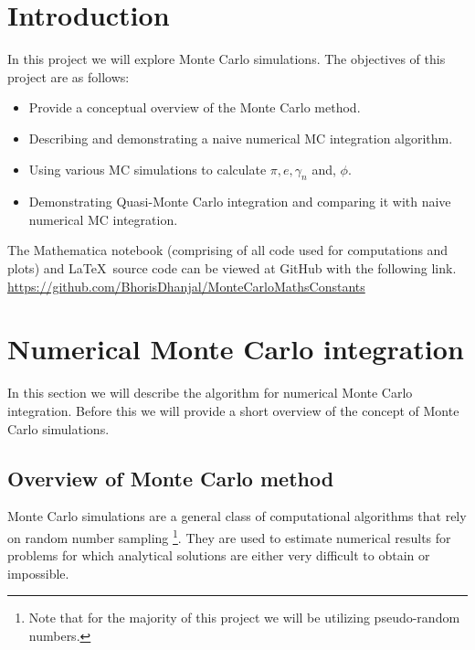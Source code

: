 \documentclass[12pt]{article}
\numberwithin{equation}{section}
\begin{document}
\section{Introduction} %
In this project we will explore Monte Carlo simulations.
The objectives of this project are as follows:
\begin{itemize}
    \item Provide a conceptual overview of the Monte Carlo method.
    \item Describing and demonstrating a naive numerical MC integration algorithm.
    \item Using various MC simulations to calculate $\pi, e, \gamma_n$ and, $\phi$.
    \item Demonstrating Quasi-Monte Carlo integration and comparing it with naive numerical MC integration.
\end{itemize}\par
The Mathematica notebook (comprising of all code used for computations and plots) and \LaTeX \ source code can be viewed at GitHub with the following link.\\
\href{https://github.com/BhorisDhanjal/reciprocal-multifactorial-constants}{\faGithubSquare} \href{https://github.com/BhorisDhanjal/MonteCarloMathsConstants}{https://github.com/BhorisDhanjal/MonteCarloMathsConstants}
\vfill
\section{Numerical Monte Carlo integration}
In this section we will describe the algorithm for numerical Monte Carlo integration. Before this we will provide a short overview of the concept of Monte Carlo simulations.
\subsection{Overview of Monte Carlo method}
Monte Carlo simulations are a general class of computational algorithms that rely on random number sampling \footnote{Note that for the majority of this project we will be utilizing pseudo-random numbers.}. They are used to estimate numerical results for problems for which analytical solutions are either very difficult to obtain or impossible.
\end{document}
